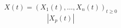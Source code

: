 \documentclass{article}
\newcommand{\comma}{{,}}
\begin{document}
\[ X (t) = (X_1 (t) \comma \ldots, X_n (t))_{t \geqslant 0} \]
\[ | X_p (t) | \]
\end{document}

